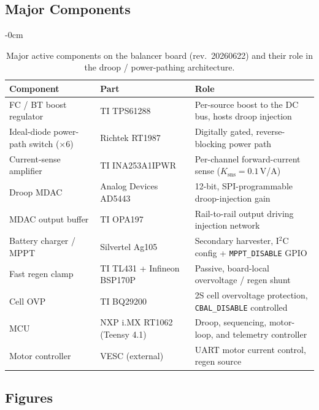 \subsection{Major Components}
\label{sec:bom-table}


\begin{table}[H]
\centering
\caption{Major active components on the balancer board (rev.\ 20260622)
and their role in the droop / power-pathing architecture.}
\label{tab:major-ics}
\begin{adjustwidth}{-\extralength}{0cm}
\centering
\begin{tabular}{lll}
\toprule
\textbf{Component} & \textbf{Part} & \textbf{Role} \\
\midrule
FC / BT boost regulator & TI TPS61288 & Per-source boost to the DC bus, hosts droop injection \\
Ideal-diode power-path switch ($\times$6) & Richtek RT1987 & Digitally gated, reverse-blocking power path \\
Current-sense amplifier & TI INA253A1IPWR & Per-channel forward-current sense ($K_\text{sns}=0.1$\,V/A) \\
Droop MDAC & Analog Devices AD5443 & 12-bit, SPI-programmable droop-injection gain \\
MDAC output buffer & TI OPA197 & Rail-to-rail output driving injection network \\
Battery charger / MPPT & Silvertel Ag105 & Secondary harvester, I$^2$C config + \texttt{MPPT\_DISABLE} GPIO \\
Fast regen clamp & TI TL431 + Infineon BSP170P & Passive, board-local overvoltage / regen shunt \\
Cell OVP & TI BQ29200 & 2S cell overvoltage protection, \texttt{CBAL\_DISABLE} controlled \\
MCU & NXP i.MX RT1062 (Teensy 4.1) & Droop, sequencing, motor-loop, and telemetry controller \\
Motor controller & VESC (external) & UART motor current control, regen source \\
\bottomrule
\end{tabular}
\end{adjustwidth}
\end{table}

\subsection{Figures}
\label{sec:board-figures}

